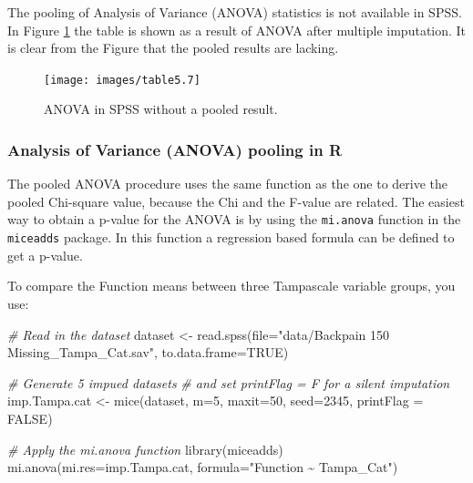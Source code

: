 \documentclass[
]{book}
\newenvironment{Shaded}{\begin{snugshade}}{\end{snugshade}}
\newcommand{\AttributeTok}[1]{\textcolor[rgb]{0.77,0.63,0.00}{#1}}
\newcommand{\CommentTok}[1]{\textcolor[rgb]{0.56,0.35,0.01}{\textit{#1}}}
\newcommand{\ConstantTok}[1]{\textcolor[rgb]{0.00,0.00,0.00}{#1}}
\newcommand{\DecValTok}[1]{\textcolor[rgb]{0.00,0.00,0.81}{#1}}
\newcommand{\FunctionTok}[1]{\textcolor[rgb]{0.00,0.00,0.00}{#1}}
\newcommand{\NormalTok}[1]{#1}
\newcommand{\OtherTok}[1]{\textcolor[rgb]{0.56,0.35,0.01}{#1}}
\newcommand{\StringTok}[1]{\textcolor[rgb]{0.31,0.60,0.02}{#1}}
\begin{document}
The pooling of Analysis of Variance (ANOVA) statistics is not available in SPSS. In Figure \ref{fig:tab5-7} the table is shown as a result of ANOVA after multiple imputation. It is clear from the Figure that the pooled results are lacking.

\begin{figure}

{\centering \texttt{[image: images/table5.7]} 

}

\caption{ANOVA in SPSS without a pooled result.}\label{fig:tab5-7}
\end{figure}

\hypertarget{analysis-of-variance-anova-pooling-in-r}{%
\subsubsection{Analysis of Variance (ANOVA) pooling in R}\label{analysis-of-variance-anova-pooling-in-r}}

The pooled ANOVA procedure uses the same function as the one to derive the pooled Chi-square value, because the Chi and the F-value are related. The easiest way to obtain a p-value for the ANOVA is by using the \texttt{mi.anova} function in the \texttt{miceadds} package. In this function a regression based formula can be defined to get a p-value.

To compare the Function means between three Tampascale variable groups, you use:

\begin{Shaded}
\begin{Highlighting}[]
\CommentTok{\# Read in the dataset}
\NormalTok{dataset }\OtherTok{\textless{}{-}} \FunctionTok{read.spss}\NormalTok{(}\AttributeTok{file=}\StringTok{"data/Backpain 150 Missing\_Tampa\_Cat.sav"}\NormalTok{, }\AttributeTok{to.data.frame=}\ConstantTok{TRUE}\NormalTok{)}

\CommentTok{\# Generate 5 impued datasets }
\CommentTok{\# and set printFlag = F for a silent imputation}
\NormalTok{imp.Tampa.cat }\OtherTok{\textless{}{-}} \FunctionTok{mice}\NormalTok{(dataset, }\AttributeTok{m=}\DecValTok{5}\NormalTok{, }\AttributeTok{maxit=}\DecValTok{50}\NormalTok{, }\AttributeTok{seed=}\DecValTok{2345}\NormalTok{, }\AttributeTok{printFlag =} \ConstantTok{FALSE}\NormalTok{)}

\CommentTok{\# Apply the mi.anova function}
\FunctionTok{library}\NormalTok{(miceadds)}
\FunctionTok{mi.anova}\NormalTok{(}\AttributeTok{mi.res=}\NormalTok{imp.Tampa.cat, }\AttributeTok{formula=}\StringTok{"Function \textasciitilde{} Tampa\_Cat"}\NormalTok{)}
\end{Highlighting}
\end{Shaded}
\end{document}
